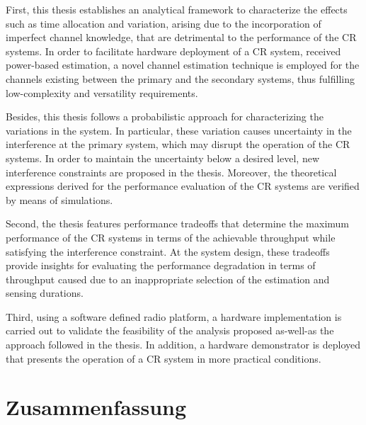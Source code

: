 First, this thesis establishes an analytical framework to characterize the effects such as time allocation and variation, arising due to the incorporation of imperfect channel knowledge, that are detrimental to the performance of the CR systems. In order to facilitate hardware deployment of a CR system, received power-based estimation, a novel channel estimation technique is employed for the channels existing between the primary and the secondary systems, thus fulfilling low-complexity and versatility requirements. 

Besides, this thesis follows a probabilistic approach for characterizing the variations in the system. In particular, these variation causes uncertainty in the interference at the primary system, which may disrupt the operation of the CR systems. In order to maintain the uncertainty below a desired level, new interference constraints are proposed in the thesis. Moreover, the theoretical expressions derived for the performance evaluation of the CR systems are verified by means of simulations. 




Second, the thesis features performance tradeoffs that determine the maximum performance of the CR systems in terms of the achievable throughput while satisfying the interference constraint. At the system design, these tradeoffs provide insights for evaluating the performance degradation in terms of throughput caused due to an inappropriate selection of the estimation and sensing durations. 

Third, using a software defined radio platform, a hardware implementation is carried out to validate the feasibility of the analysis proposed as-well-as the approach followed in the thesis. In addition, a hardware demonstrator is deployed that presents the operation of a CR system in more practical conditions. %



\cleardoublepage
\chapter*{Zusammenfassung}


\cleardoublepage

